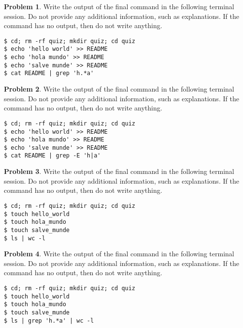 \documentclass[10pt]{article}
\theoremstyle{definition}
\newtheorem{problem}{Problem}
\begin{document}
\begin{samepage}
\begin{problem}
Write the output of the final command in the following terminal session.
Do not provide any additional information,
such as explanations.
If the command has no output,
then do not write anything.

\end{problem}
\begin{lstlisting}
$ cd; rm -rf quiz; mkdir quiz; cd quiz
$ echo 'hello world' >> README
$ echo 'hola mundo' >> README
$ echo 'salve munde' >> README
$ cat README | grep 'h.*a'
\end{lstlisting}
\end{samepage}


\begin{samepage}
\begin{problem}
Write the output of the final command in the following terminal session.
Do not provide any additional information,
such as explanations.
If the command has no output,
then do not write anything.

\end{problem}
\begin{lstlisting}
$ cd; rm -rf quiz; mkdir quiz; cd quiz
$ echo 'hello world' >> README
$ echo 'hola mundo' >> README
$ echo 'salve munde' >> README
$ cat README | grep -E 'h|a'
\end{lstlisting}
\end{samepage}


\begin{samepage}
\begin{problem}
Write the output of the final command in the following terminal session.
Do not provide any additional information,
such as explanations.
If the command has no output,
then do not write anything.

\end{problem}
\begin{lstlisting}
$ cd; rm -rf quiz; mkdir quiz; cd quiz
$ touch hello_world
$ touch hola_mundo
$ touch salve_munde
$ ls | wc -l
\end{lstlisting}
\end{samepage}


\begin{samepage}
\begin{problem}
Write the output of the final command in the following terminal session.
Do not provide any additional information,
such as explanations.
If the command has no output,
then do not write anything.

\end{problem}
\begin{lstlisting}
$ cd; rm -rf quiz; mkdir quiz; cd quiz
$ touch hello_world
$ touch hola_mundo
$ touch salve_munde
$ ls | grep 'h.*a' | wc -l
\end{lstlisting}
\end{samepage}
\end{document}
